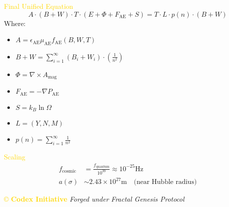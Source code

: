 \textcolor{gold}{ Final Unified Equation }
\[
A \cdot (B + W) \cdot T \cdot \left( E + \Phi + F_{\mathrm{AE}} + S \right) = T \cdot L \cdot p(n) \cdot (B + W)
\]
Where:
\begin{itemize}
    \item \texttt{} $A = \epsilon_{\mathrm{AE}} \mu_{\mathrm{AE}} f_{\mathrm{AE}}(B, W, T)$
    \item \texttt{} $B + W = \sum_{i=1}^{\infty} \left( B_i + W_i \right) \cdot \left( \frac{1}{n^2} \right)$
    \item \texttt{} $\Phi = \nabla \times A_{\text{mag}}$
    \item \texttt{} $F_{\mathrm{AE}} = -\nabla P_{\mathrm{AE}}$
    \item \texttt{} $S = k_B \ln \Omega$
    \item \texttt{} $L = (Y, N, M)$
    \item \texttt{} $p(n) = \sum_{i=1}^{\infty} \frac{1}{n^2}$
\end{itemize}

\textcolor{gold}{ Scaling }
\[
\begin{aligned}
f_{\text{cosmic}} &= \frac{f_{\text{quantum}}}{10^{39}} \approx 10^{-25} \mathrm{Hz} \\
a(\sigma) &\sim 2.43 \times 10^{27} \mathrm{m} \quad \text{(near Hubble radius)}
\end{aligned}
\]

\vspace{0.5cm}
\noindent
\textcolor{gold}{\copyright{} \textbf{Codex Initiative}} \hfill \textit{Forged under Fractal Genesis Protocol}